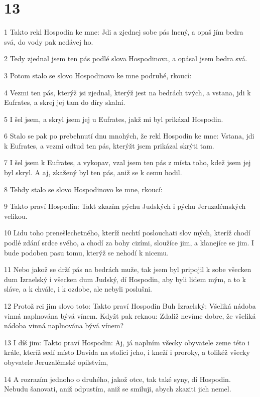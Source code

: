 \chapter{13}

\par 1 Takto rekl Hospodin ke mne: Jdi a zjednej sobe pás lnený, a opaš jím bedra svá, do vody pak nedávej ho.
\par 2 Tedy zjednal jsem ten pás podlé slova Hospodinova, a opásal jsem bedra svá.
\par 3 Potom stalo se slovo Hospodinovo ke mne podruhé, rkoucí:
\par 4 Vezmi ten pás, kterýž jsi zjednal, kterýž jest na bedrách tvých, a vstana, jdi k Eufrates, a skrej jej tam do díry skalní.
\par 5 I šel jsem, a skryl jsem jej u Eufrates, jakž mi byl prikázal Hospodin.
\par 6 Stalo se pak po prebehnutí dnu mnohých, že rekl Hospodin ke mne: Vstana, jdi k Eufrates, a vezmi odtud ten pás, kterýžt jsem prikázal skrýti tam.
\par 7 I šel jsem k Eufrates, a vykopav, vzal jsem ten pás z místa toho, kdež jsem jej byl skryl. A aj, zkažený byl ten pás, aniž se k cemu hodil.
\par 8 Tehdy stalo se slovo Hospodinovo ke mne, rkoucí:
\par 9 Takto praví Hospodin: Takt zkazím pýchu Judských i pýchu Jeruzalémských velikou.
\par 10 Lidu toho prenešlechetného, kteríž nechtí poslouchati slov mých, kteríž chodí podlé zdání srdce svého, a chodí za bohy cizími, sloužíce jim, a klanejíce se jim. I bude podoben pasu tomu, kterýž se nehodí k nicemu.
\par 11 Nebo jakož se drží pás na bedrách muže, tak jsem byl pripojil k sobe všecken dum Izraelský i všecken dum Judský, dí Hospodin, aby byli lidem mým, a to k sláve, a k chvále, i k ozdobe, ale nebyli poslušni.
\par 12 Protož rci jim slovo toto: Takto praví Hospodin Buh Izraelský: Všeliká nádoba vinná naplnována bývá vínem. Kdyžt pak reknou: Zdaliž nevíme dobre, že všeliká nádoba vinná naplnována bývá vínem?
\par 13 I díš jim: Takto praví Hospodin: Aj, já naplním všecky obyvatele zeme této i krále, kteríž sedí místo Davida na stolici jeho, i kneží i proroky, a tolikéž všecky obyvatele Jeruzalémské opilstvím,
\par 14 A rozrazím jednoho o druhého, jakož otce, tak také syny, dí Hospodin. Nebudu šanovati, aniž odpustím, aniž se smiluji, abych zkaziti jich nemel.
